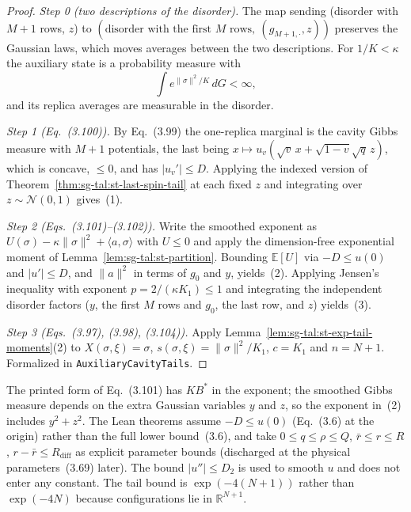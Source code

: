 \begin{proof}
  \leanok
\emph{Step 0 (two descriptions of the disorder).} The map sending (disorder with $M+1$ rows, $z$) to
$(\text{disorder with the first }M\text{ rows},\ (g_{M+1,\cdot},z))$ preserves the Gaussian laws, which moves
averages between the two descriptions. For $1/K<\kappa$ the auxiliary state is a probability measure with
\[
\int e^{\|\sigma\|^2/K}\,dG<\infty,
\]
and its replica averages are measurable in the disorder.

\emph{Step 1 (Eq.~(3.100)).} By Eq.~(3.99) the one-replica marginal is the cavity Gibbs measure with
$M+1$ potentials, the last being $x\mapsto u_v(\sqrt v\,x+\sqrt{1-v}\sqrt q\,z)$, which is concave, $\le0$,
and has $|u_v'|\le D$. Applying the indexed version of Theorem~\ref{thm:sg-tal:st-last-spin-tail} at each
fixed $z$ and integrating over $z\sim\mathcal N(0,1)$ gives~(1).

\emph{Step 2 (Eqs.~(3.101)--(3.102)).} Write the smoothed exponent as $U(\sigma)-\kappa\|\sigma\|^2+\langle a,\sigma\rangle$
with $U\le0$ and apply the dimension-free exponential moment of Lemma~\ref{lem:sg-tal:st-partition}. Bounding
$\mathbb E[U]$ via $-D\le u(0)$ and $|u'|\le D$, and $\|a\|^2$ in terms of $g_0$ and $y$, yields~(2).
Applying Jensen's inequality with exponent $p=2/(\kappa K_1)\le1$ and integrating the independent disorder
factors ($y$, the first $M$ rows and $g_0$, the last row, and $z$) yields~(3).

\emph{Step 3 (Eqs.~(3.97), (3.98), (3.104)).} Apply Lemma~\ref{lem:sg-tal:st-exp-tail-moments}(2) to
$X(\sigma,\xi)=\sigma$, $s(\sigma,\xi)=\|\sigma\|^2/K_1$, $c=K_1$ and $n=N+1$.
Formalized in \texttt{AuxiliaryCavityTails}.
\end{proof}

\begin{remark}\label{rem:sg-tal:st-eq-3101}
The printed form of Eq.~(3.101) has $K B^*$ in the exponent; the smoothed Gibbs measure depends on the
extra Gaussian variables $y$ and $z$, so the exponent in~(2) includes $y^2+z^2$.
The Lean theorems assume $-D\le u(0)$ (Eq.~(3.6) at the origin) rather than the full lower bound~(3.6),
and take $0\le q\le\rho\le Q$, $\bar r\le r\le R$, $r-\bar r\le R_{\mathrm{diff}}$ as explicit parameter
bounds (discharged at the physical parameters~(3.69) later). The bound $|u''|\le D_2$ is used to smooth
$u$ and does not enter any constant. The tail bound is $\exp(-4(N+1))$ rather than $\exp(-4N)$ because
configurations lie in $\mathbb R^{N+1}$.
\end{remark}

